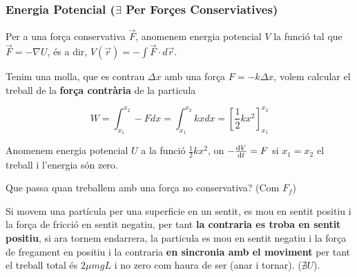 \documentclass[12pt]{article}
\begin{document}
\subsubsection{\texorpdfstring{Energia Potencial ($\exists$ Per Forçes Conserviatives)}{Energia Potencial (Per Forçes Conserviatives)}}

Per a una força conservativa $\vec F$, anomenem energia potencial $V$ la funció tal que $\vec F = -\nabla U$, és a dir, $V(\vec r) = -\int \vec F\cdot d\vec r$.

\begin{examplebox}{}
    Tenim una molla, que es contrau $\Delta x$ amb una força $F = -k\Delta x$, volem calcular el treball de la \textbf{força contrària} de la particula

    \begin{center}
\end{center}

    \[W = \int_{x_1}^{x_2} -F dx = \int_{x_1}^{x_2} kx dx = [\frac{1}{2}kx^2]_{x_1}^{x_2}\]

    Anomenem energia potencial $U$ a la funció $\frac{1}{2}kx^2$, on $-\dv{V}{t} = F$ si $x_1=x_2$ el treball i l'energia són zero.
\end{examplebox}

Que passa quan treballem amb una força no conservativa? (Com $F_f$)

Si movem una partícula per una superficie en un sentit, es mou en sentit positiu i la força de fricció en sentit negatiu, per tant \textbf{la contraria es troba en sentit positiu}, si ara tornem endarrera, la particula es mou en sentit negatiu i la força de fregament en positiu i la contraria \textbf{en sincronia amb el moviment} per tant el treball total és $2 \mu mg L$ i no zero com haura de ser (anar i tornar).  ($\nexists U$).
\end{document}
